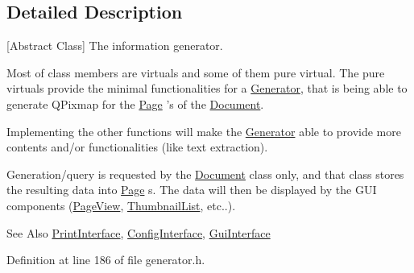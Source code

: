 \subsection{Detailed Description}
\mbox{[}Abstract Class\mbox{]} The information generator. 

Most of class members are virtuals and some of them pure virtual. The pure virtuals provide the minimal functionalities for a \hyperlink{classOkular_1_1Generator}{Generator}, that is being able to generate Q\+Pixmap for the \hyperlink{classOkular_1_1Page}{Page} 's of the \hyperlink{classOkular_1_1Document}{Document}.

Implementing the other functions will make the \hyperlink{classOkular_1_1Generator}{Generator} able to provide more contents and/or functionalities (like text extraction).

Generation/query is requested by the \hyperlink{classOkular_1_1Document}{Document} class only, and that class stores the resulting data into \hyperlink{classOkular_1_1Page}{Page} s. The data will then be displayed by the G\+U\+I components (\hyperlink{classPageView}{Page\+View}, \hyperlink{classThumbnailList}{Thumbnail\+List}, etc..).

\begin{DoxySeeAlso}{See Also}
\hyperlink{classOkular_1_1PrintInterface}{Print\+Interface}, \hyperlink{classOkular_1_1ConfigInterface}{Config\+Interface}, \hyperlink{classOkular_1_1GuiInterface}{Gui\+Interface} 
\end{DoxySeeAlso}


Definition at line 186 of file generator.\+h.



